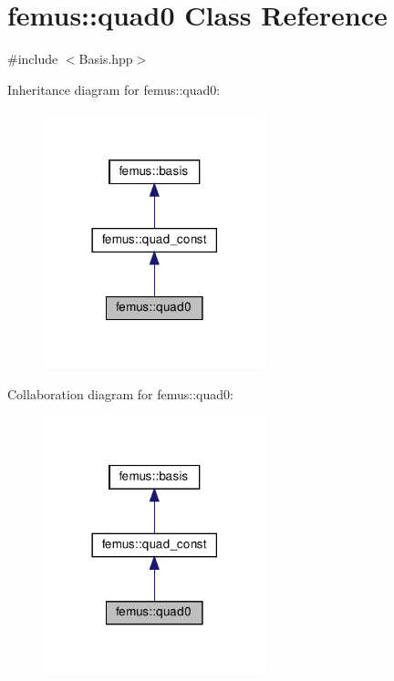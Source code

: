 \hypertarget{classfemus_1_1quad0}{}\section{femus\+:\+:quad0 Class Reference}
\label{classfemus_1_1quad0}


{\ttfamily \#include $<$Basis.\+hpp$>$}



Inheritance diagram for femus\+:\+:quad0\+:
\nopagebreak
\begin{figure}[H]
\begin{center}
\leavevmode
\includegraphics[width=182pt]{classfemus_1_1quad0__inherit__graph}
\end{center}
\end{figure}


Collaboration diagram for femus\+:\+:quad0\+:
\nopagebreak
\begin{figure}[H]
\begin{center}
\leavevmode
\includegraphics[width=182pt]{classfemus_1_1quad0__coll__graph}
\end{center}
\end{figure}
